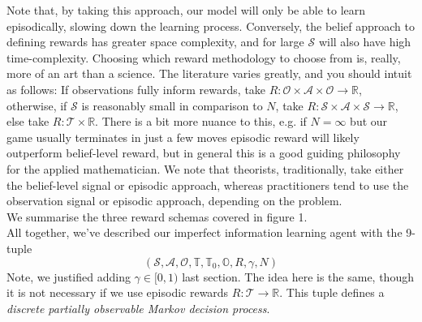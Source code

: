 \documentclass[12pt]{article}
\begin{document}
Note that, by taking this approach, our model will only be able to learn episodically, slowing down the learning process. Conversely, 
the belief approach to defining rewards has greater space complexity, and for large $\mathcal{S}$ will also have high time-complexity. 
Choosing which reward methodology to choose from is, really, more of an art than a science. The literature varies greatly, and you 
should intuit as follows: If observations fully inform rewards, take $R: \mathcal{O} \times \mathcal{A} \times \mathcal{O} \to 
\mathbb{R}$, otherwise, if $\mathcal{S}$ is reasonably small in comparison to $N$, take $R: \mathcal{S} \times \mathcal{A} 
\times \mathcal{S} \to \mathbb{R}$, else take $R: \mathcal{T} \times \mathbb{R}$. There is a bit more nuance to this, e.g. if 
$N = \infty$ but our game usually terminates in just a few moves episodic reward will likely outperform belief-level reward, 
but in general this is a good guiding philosophy for the applied mathematician. We note that theorists, traditionally, take 
either the belief-level signal or episodic approach, whereas practitioners tend to use the observation signal or episodic approach, 
depending on the problem. \\ 

We summarise the three reward schemas covered in figure 1. \\

All together, we've described our imperfect information learning agent with the 9-tuple
$$(\mathcal{S}, \mathcal{A}, \mathcal{O}, \mathbb{T}, \mathbb{T}_0, \mathbb{O}, R, \gamma, N)$$ 
Note, we justified adding $\gamma \in [0, 1)$ last section. The idea here is the same, though it is not necessary if we 
use episodic rewards $R: \mathcal{T} \to \mathbb{R}$. This tuple defines a \textit{discrete partially observable Markov 
decision process}.
\end{document}
